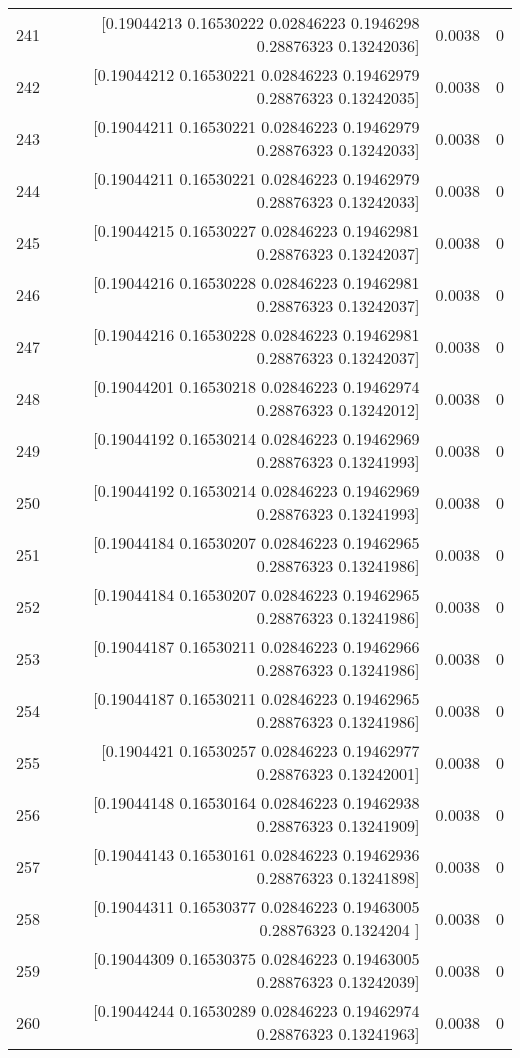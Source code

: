 \begin{longtable}{lrrr}
241 & [0.19044213 0.16530222 0.02846223 0.1946298  0.28876323 0.13242036] & 0.0038 & 0 \\
242 & [0.19044212 0.16530221 0.02846223 0.19462979 0.28876323 0.13242035] & 0.0038 & 0 \\
243 & [0.19044211 0.16530221 0.02846223 0.19462979 0.28876323 0.13242033] & 0.0038 & 0 \\
244 & [0.19044211 0.16530221 0.02846223 0.19462979 0.28876323 0.13242033] & 0.0038 & 0 \\
245 & [0.19044215 0.16530227 0.02846223 0.19462981 0.28876323 0.13242037] & 0.0038 & 0 \\
246 & [0.19044216 0.16530228 0.02846223 0.19462981 0.28876323 0.13242037] & 0.0038 & 0 \\
247 & [0.19044216 0.16530228 0.02846223 0.19462981 0.28876323 0.13242037] & 0.0038 & 0 \\
248 & [0.19044201 0.16530218 0.02846223 0.19462974 0.28876323 0.13242012] & 0.0038 & 0 \\
249 & [0.19044192 0.16530214 0.02846223 0.19462969 0.28876323 0.13241993] & 0.0038 & 0 \\
250 & [0.19044192 0.16530214 0.02846223 0.19462969 0.28876323 0.13241993] & 0.0038 & 0 \\
251 & [0.19044184 0.16530207 0.02846223 0.19462965 0.28876323 0.13241986] & 0.0038 & 0 \\
252 & [0.19044184 0.16530207 0.02846223 0.19462965 0.28876323 0.13241986] & 0.0038 & 0 \\
253 & [0.19044187 0.16530211 0.02846223 0.19462966 0.28876323 0.13241986] & 0.0038 & 0 \\
254 & [0.19044187 0.16530211 0.02846223 0.19462965 0.28876323 0.13241986] & 0.0038 & 0 \\
255 & [0.1904421  0.16530257 0.02846223 0.19462977 0.28876323 0.13242001] & 0.0038 & 0 \\
256 & [0.19044148 0.16530164 0.02846223 0.19462938 0.28876323 0.13241909] & 0.0038 & 0 \\
257 & [0.19044143 0.16530161 0.02846223 0.19462936 0.28876323 0.13241898] & 0.0038 & 0 \\
258 & [0.19044311 0.16530377 0.02846223 0.19463005 0.28876323 0.1324204 ] & 0.0038 & 0 \\
259 & [0.19044309 0.16530375 0.02846223 0.19463005 0.28876323 0.13242039] & 0.0038 & 0 \\
260 & [0.19044244 0.16530289 0.02846223 0.19462974 0.28876323 0.13241963] & 0.0038 & 0 \\

\end{longtable}
